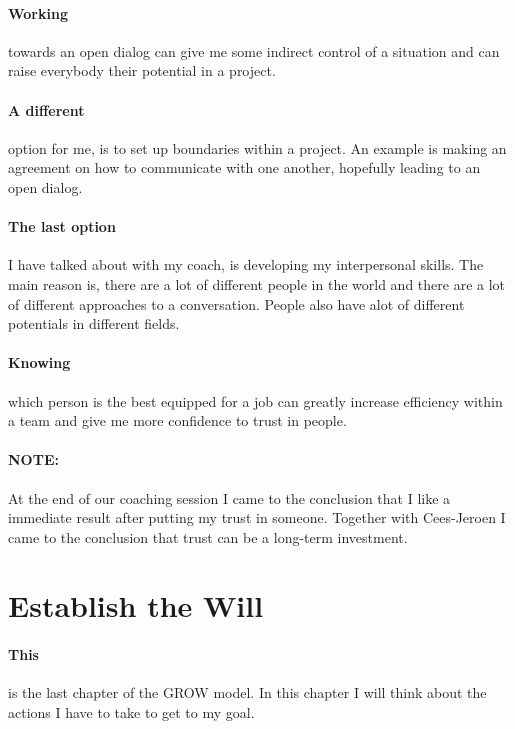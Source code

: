 \documentclass[11pt]{article}
\begin{document}
	\paragraph{Working} towards an open dialog can give me some indirect control of a situation and can raise everybody their potential in a project. 
	
	\paragraph{A different} option for me, is to set up boundaries within a project. An example is making an agreement on how to communicate with one another, hopefully leading to an open dialog. 
	
	\paragraph{The last option} I have talked about with my coach, is developing my interpersonal skills. The main reason is, there are a lot of different people in the world and there are a lot of different approaches to a conversation. People also have alot of different potentials in different fields. 
	
	\paragraph{Knowing} which person is the best equipped for a job can greatly increase efficiency within a team and give me more confidence to trust in people.
	
	\paragraph{NOTE:} At the end of our coaching session I came to the conclusion that I like a immediate result after putting my trust in someone. Together with Cees-Jeroen I came to the conclusion that trust can be a long-term investment.  
	
	\section{Establish the Will}\label{sec:Will}
	\paragraph{This} is the last chapter of the GROW model. In this chapter I will think about the actions I have to take to get to my goal. 
	
\end{document}
